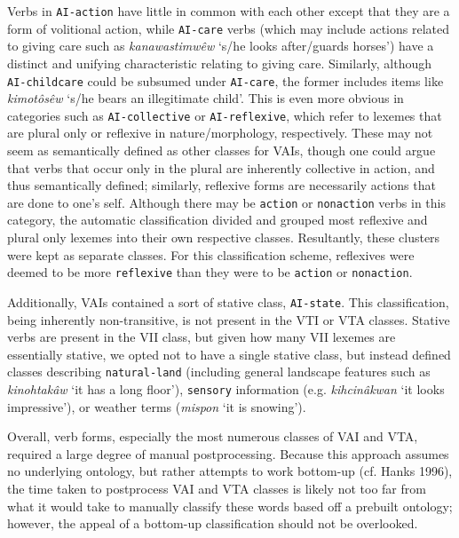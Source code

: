 Verbs in \texttt{AI-action} have little in common with each other except that they are a form of volitional action, while \texttt{AI-care} verbs (which may include actions related to giving care such as \textit{kanawastimwêw} ‘s/he looks after/guards horses’) have a distinct and unifying characteristic relating to giving care. Similarly, although \texttt{AI-childcare} could be subsumed under \texttt{AI-care}, the former includes items like \textit{kimotôsêw} ‘s/he bears an illegitimate child’. This is even more obvious in categories such as \texttt{AI-collective} or \texttt{AI-reflexive}, which refer to lexemes that are plural only or reflexive in nature/morphology, respectively. These may not seem as semantically defined as other classes for VAIs, though one could argue that verbs that occur only in the plural are inherently collective in action, and thus semantically defined; similarly, reflexive forms are necessarily actions that are done to one’s self. Although there may be \texttt{action} or \texttt{nonaction} verbs in this category, the automatic classification divided and grouped most reflexive and plural only lexemes into their own respective classes. Resultantly, these clusters were kept as separate classes. For this classification scheme, reflexives were deemed to be more \texttt{reflexive} than they were to be \texttt{action} or \texttt{nonaction}. 

Additionally, VAIs contained a sort of stative class, \texttt{AI-state}. This classification, being inherently non-transitive, is not present in the VTI or VTA classes. Stative verbs are present in the VII class, but given how many VII lexemes are essentially stative, we opted not to have a single stative class, but instead defined classes describing \texttt{natural-land} (including general landscape features such as \textit{kinohtakâw} ‘it has a long floor’), \texttt{sensory} information (e.g. \textit{kihcinâkwan} ‘it looks impressive’), or weather terms (\textit{mispon} ‘it is snowing’).

Overall, verb forms, especially the most numerous classes of VAI and VTA, required a large degree of manual postprocessing. Because this approach assumes no underlying ontology, but rather attempts to work bottom-up (cf. Hanks 1996), the time taken to postprocess VAI and VTA classes is likely not too far from what it would take to manually classify these words based off a prebuilt ontology; however, the appeal of a bottom-up classification should not be overlooked. 




